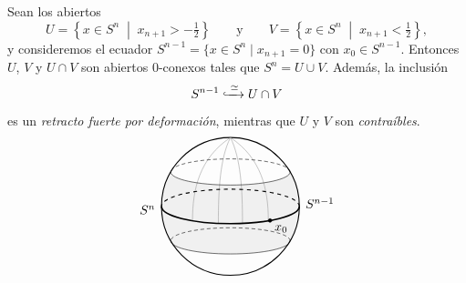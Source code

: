 \begin{dem}
Sean los abiertos
\[
U = \left\{ x \in S^n \;\middle|\; x_{n+1} > -\tfrac{1}{2} \right\} \qquad \text{y} \qquad V = \left\{ x \in S^n \;\middle|\; x_{n+1} < \tfrac{1}{2} \right\},
\]
y consideremos el ecuador $S^{n-1} = \{ x \in S^n \mid x_{n+1} = 0 \}$ con $x_0 \in S^{n-1}$. Entonces $U$, $V$ y $U \cap V$ son abiertos $0$-conexos tales que $S^n = U \cup V$. Además, la inclusión
\[
S^{n-1} \xhookrightarrow{\;\simeq\;} U \cap V
\]
es un \textit{retracto fuerte por deformación}, mientras que $U$ y $V$ son \textit{contraíbles}.
\[
\begin{tikzpicture}[scale=0.95, >=stealth]
    \begin{scope}[shift={(0,0)}]
        \fill[gray!12] (-1.732, 1) arc (180:360:1.732 and 0.38)
            .. controls (2.05, 0.35) and (2.05, -0.35) .. (1.732, -1)
            arc (360:180:1.732 and 0.38)
            .. controls (-2.05, -0.35) and (-2.05, 0.35) .. (-1.732, 1);

        \draw[thick] (0,0) circle (2);

        \draw[thin, gray!80] (0, 2) .. controls (-0.9, 1.4) and (-1.1, 0.5) .. (-1.1, -0.41);
        \draw[thin, gray!80] (0, 2) .. controls (-0.3, 1.4) and (-0.35, 0.5) .. (-0.35, -0.49);
        \draw[thin, gray!80] (0, 2) .. controls (0.3, 1.4) and (0.35, 0.5) .. (0.35, -0.49);
        \draw[thin, gray!80] (0, 2) .. controls (0.9, 1.4) and (1.1, 0.5) .. (1.1, -0.41);

        \draw[densely dashed, thin] (1.732, 1) arc (0:180:1.732 and 0.38);
        \draw[thin] (-1.732, 1) arc (180:360:1.732 and 0.38);

        \draw[densely dashed, thin] (1.732, -1) arc (0:180:1.732 and 0.38);
        \draw[thin] (-1.732, -1) arc (180:360:1.732 and 0.38);

        \draw[dashed, thick] (2, 0) arc (0:180:2 and 0.5);
        \draw[very thick] (-2, 0) arc (180:360:2 and 0.5);

        \filldraw (1.15, -0.41) circle (1.5pt) node[below right] {$ x_0$};

        \node[left] at (-2.05, -0.1) {$S^n$};
        \node[right] at (2.05, 0.1) {$S^{n-1}$};
    \end{scope}


\end{tikzpicture}\]
\end{dem}

